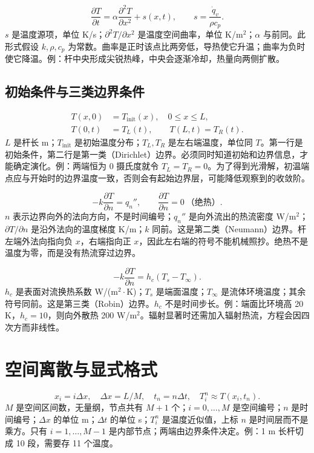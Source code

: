 \documentclass[UTF8,zihao=-4,openany,oneside,fontset=windows]{ctexbook}
\begin{document}
\begin{equation}
\frac{\partial T}{\partial t}=\alpha\frac{\partial^2 T}{\partial x^2}+s(x,t),\qquad s=\frac{\dot q_v}{\rho c_p}.
\end{equation}
$s$ 是温度源项，单位 K/s；$\partial^2 T/\partial x^2$ 是温度空间曲率，单位 K/m$^2$；$\alpha$ 与前同。此形式假设 $k,\rho,c_p$ 为常数。曲率是正时该点比两旁低，导热使它升温；曲率为负时使它降温。例：杆中央形成尖锐热峰，中央会逐渐冷却，热量向两侧扩散。

\subsection{初始条件与三类边界条件}
\begin{align}
T(x,0)&=T_{\mathrm{init}}(x),\quad 0\leq x\leq L,\\
T(0,t)&=T_L(t),\qquad T(L,t)=T_R(t).
\end{align}
$L$ 是杆长 m；$T_{\mathrm{init}}$ 是初始温度分布；$T_L,T_R$ 是左右端温度，单位同 $T$。第一行是初始条件，第二行是第一类（Dirichlet）边界。必须同时知道初始和边界信息，才能确定演化。例：两端恒为 0 摄氏度就令 $T_L=T_R=0$。为了得到光滑解，初温端点应与开始时的边界温度一致，否则会有起始边界层，可能降低观察到的收敛阶。

\begin{equation}
-k\frac{\partial T}{\partial n}=q_n'',\qquad
\frac{\partial T}{\partial n}=0\ \text{（绝热）}.
\end{equation}
$n$ 表示边界向外的法向方向，不是时间编号；$q_n''$ 是向外流出的热流密度 W/m$^2$；$\partial T/\partial n$ 是沿外法向的温度梯度 K/m；$k$ 同前。这是第二类（Neumann）边界。杆左端外法向指向负 $x$，右端指向正 $x$，因此左右端的符号不能机械照抄。绝热不是温度为零，而是没有热流穿过边界。

\begin{equation}
-k\frac{\partial T}{\partial n}=h_c(T_s-T_\infty).
\end{equation}
$h_c$ 是表面对流换热系数 W/(m$^2\cdot$K)；$T_s$ 是端面温度；$T_\infty$ 是流体环境温度；其余符号同前。这是第三类（Robin）边界。$h_c$ 不是时间步长。例：端面比环境高 20 K，$h_c=10$，则向外散热 200 W/m$^2$。辐射显著时还需加入辐射热流，方程会因四次方而非线性。

\section{空间离散与显式格式}
\begin{equation}
x_i=i\Delta x,\quad \Delta x=L/M,\quad t_n=n\Delta t,\quad T_i^n\approx T(x_i,t_n).
\end{equation}
$M$ 是空间区间数，无量纲，节点共有 $M+1$ 个；$i=0,\ldots,M$ 是空间编号；$n$ 是时间编号；$\Delta x$ 的单位 m；$\Delta t$ 的单位 s；$T_i^n$ 是温度近似值，上标 $n$ 是时间层而不是乘方。只有 $i=1,\ldots,M-1$ 是内部节点；两端由边界条件决定。例：1 m 长杆切成 10 段，需要存 11 个温度。
\end{document}
